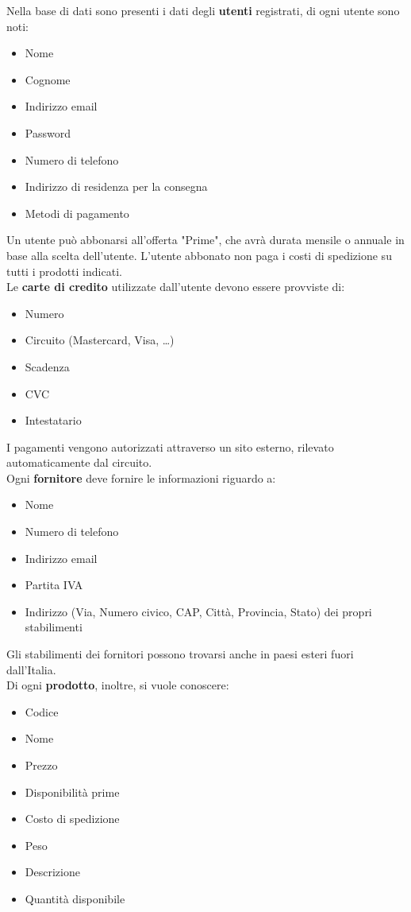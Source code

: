 \documentclass[11pt]{article}
\begin{document}
Nella base di dati sono presenti i dati degli \textbf{utenti} registrati, di ogni utente sono noti:
\begin{itemize}
    \item Nome
    \item Cognome
    \item Indirizzo email
    \item Password 
    \item Numero di telefono
    \item Indirizzo di residenza per la consegna
    \item Metodi di pagamento
\end{itemize}
Un utente può abbonarsi all'offerta "Prime", che avrà durata mensile o annuale in base alla scelta dell'utente. L'utente abbonato non paga i costi di
spedizione su tutti i prodotti indicati.\\
Le \textbf{carte di credito} utilizzate dall’utente devono essere provviste di:
\begin{itemize}
    \item Numero
    \item Circuito (Mastercard, Visa, …)
    \item Scadenza
    \item CVC
    \item Intestatario
\end{itemize}
I pagamenti vengono autorizzati attraverso un sito esterno, rilevato automaticamente dal circuito.\\
Ogni \textbf{fornitore} deve fornire le informazioni riguardo a:
\begin{itemize}
    \item Nome
    \item Numero di telefono
    \item Indirizzo email
    \item Partita IVA
    \item Indirizzo (Via, Numero civico, CAP, Città, Provincia, Stato) dei propri stabilimenti
\end{itemize} 
Gli stabilimenti dei fornitori possono trovarsi anche in paesi esteri fuori dall'Italia.\\
Di ogni \textbf{prodotto}, inoltre, si vuole conoscere:
\begin{itemize}
    \item Codice
    \item Nome
    \item Prezzo
    \item Disponibilità prime
    \item Costo di spedizione
    \item Peso
    \item Descrizione
    \item Quantità disponibile
\end{itemize}
\end{document}
